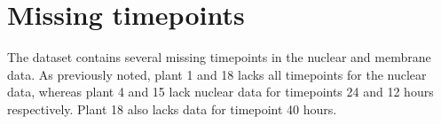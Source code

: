 \section{Missing timepoints}
\label{sec:missingtp}
The dataset contains several missing timepoints in the nuclear and membrane
data. As previously noted, plant 1 and 18 lacks all timepoints for the nuclear
data, whereas plant 4 and 15 lack nuclear data for timepoints 24 and 12 hours
respectively. Plant 18 also lacks data for timepoint 40 hours.

